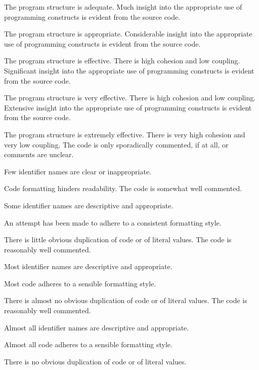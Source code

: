 \documentclass{../../fal_assignment}
\begin{document}
\begin{markingrubric}
            \par The program structure is adequate.
        \grade Much insight into the appropriate use of programming constructs is evident from the source code.
            \par The program structure is appropriate.
        \grade Considerable insight into the appropriate use of programming constructs is evident from the source code.
            \par The program structure is effective. There is high cohesion and low coupling.
        \grade Significant insight into the appropriate use of programming constructs is evident from the source code.
            \par The program structure is very effective. There is high cohesion and low coupling.
        \grade Extensive insight into the appropriate use of programming constructs is evident from the source code.
            \par The program structure is extremely effective. There is very high cohesion and very low coupling.
%
        \grade \fail The code is only sporadically commented, if at all, or comments are unclear.
            \par Few identifier names are clear or inappropriate.
            \par Code formatting hinders readability.
        \grade The code is somewhat well commented.
            \par Some identifier names are descriptive and appropriate.
            \par An attempt has been made to adhere to a consistent formatting style.
             \par There is little obvious duplication of code or of literal values.           
        \grade The code is reasonably well commented.
            \par Most identifier names are descriptive and appropriate.
            \par Most code adheres to a sensible formatting style.
             \par There is almost no obvious duplication of code or of literal values.   
        \grade The code is reasonably well commented.
            \par Almost all identifier names are descriptive and appropriate.
            \par Almost all code adheres to a sensible formatting style.
             \par There is no obvious duplication of code or of literal values.

\end{markingrubric}
\end{document}
